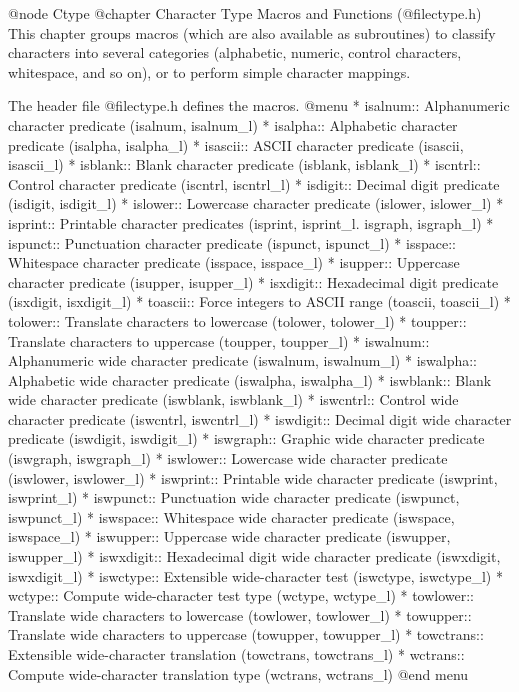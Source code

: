 @node Ctype
@chapter Character Type Macros and Functions (@file{ctype.h})
This chapter groups macros (which are also available as subroutines)
to classify characters into several categories (alphabetic,
numeric, control characters, whitespace, and so on), or to perform
simple character mappings.

The header file @file{ctype.h} defines the macros.
@menu
* isalnum::   Alphanumeric character predicate (isalnum, isalnum_l)
* isalpha::   Alphabetic character predicate (isalpha, isalpha_l)
* isascii::   ASCII character predicate (isascii, isascii_l)
* isblank::   Blank character predicate (isblank, isblank_l)
* iscntrl::   Control character predicate (iscntrl, iscntrl_l)
* isdigit::   Decimal digit predicate (isdigit, isdigit_l)
* islower::   Lowercase character predicate (islower, islower_l)
* isprint::   Printable character predicates (isprint, isprint_l. isgraph, isgraph_l)
* ispunct::   Punctuation character predicate (ispunct, ispunct_l)
* isspace::   Whitespace character predicate (isspace, isspace_l)
* isupper::   Uppercase character predicate (isupper, isupper_l)
* isxdigit::  Hexadecimal digit predicate (isxdigit, isxdigit_l)
* toascii::   Force integers to ASCII range (toascii, toascii_l)
* tolower::   Translate characters to lowercase (tolower, tolower_l)
* toupper::   Translate characters to uppercase (toupper, toupper_l)
* iswalnum::  Alphanumeric wide character predicate (iswalnum, iswalnum_l)
* iswalpha::  Alphabetic wide character predicate (iswalpha, iswalpha_l)
* iswblank::  Blank wide character predicate (iswblank, iswblank_l)
* iswcntrl::  Control wide character predicate (iswcntrl, iswcntrl_l)
* iswdigit::  Decimal digit wide character predicate (iswdigit, iswdigit_l)
* iswgraph::  Graphic wide character predicate (iswgraph, iswgraph_l)
* iswlower::  Lowercase wide character predicate (iswlower, iswlower_l)
* iswprint::  Printable wide character predicate (iswprint, iswprint_l)
* iswpunct::  Punctuation wide character predicate (iswpunct, iswpunct_l)
* iswspace::  Whitespace wide character predicate (iswspace, iswspace_l)
* iswupper::  Uppercase wide character predicate (iswupper, iswupper_l)
* iswxdigit:: Hexadecimal digit wide character predicate (iswxdigit, iswxdigit_l)
* iswctype::  Extensible wide-character test (iswctype, iswctype_l)
* wctype::    Compute wide-character test type (wctype, wctype_l)
* towlower::  Translate wide characters to lowercase (towlower, towlower_l)
* towupper::  Translate wide characters to uppercase (towupper, towupper_l)
* towctrans:: Extensible wide-character translation (towctrans, towctrans_l)
* wctrans::   Compute wide-character translation type (wctrans, wctrans_l)
@end menu


